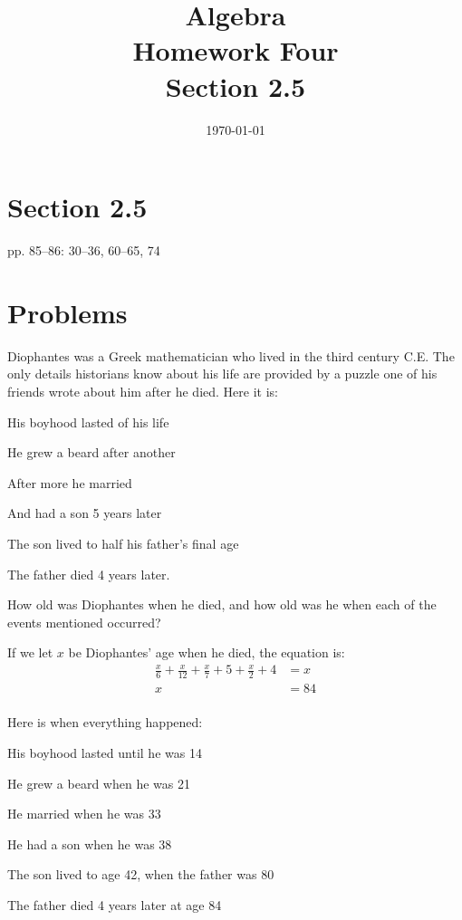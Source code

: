 \documentclass[letterpaper, landscape]{exam}
\title{Algebra \\ Homework Four \\ Section 2.5}
\author{}
\date{\today}
\begin{document}
  \maketitle

  \section{Section 2.5}
  pp. 85--86: 30--36, 60--65, 74

  \section{Problems}

  \begin{questions}

    \question{}
    Diophantes was a Greek mathematician who lived in the third century C.E.  The only details
    historians know about his life are provided by a puzzle one of his friends wrote about him after
    he died.  Here it is:

    \begin{itemize*}
      \item His boyhood lasted  of his life
      \item He grew a beard after another 
      \item After  more he married
      \item And had a son 5 years later
      \item The son lived to half his father's final age
      \item The father died 4 years later.
    \end{itemize*}

    How old was Diophantes when he died, and how old was he when each of the events mentioned occurred?

    \begin{solution}
      If we let $x$ be Diophantes' age when he died, the equation is:
      \begin{align*}
        \frac{x}{6} + \frac{x}{12} + \frac{x}{7} + 5 + \frac{x}{2} + 4 & = x \\
        x                                                              & = \boxed{84} \\
      \end{align*}

      Here is when everything happened:
      \begin{itemize*}
        \item His boyhood lasted until he was 14
        \item He grew a beard when he was 21 
        \item He married when he was 33
        \item He had a son when he was 38
        \item The son lived to age 42, when the father was 80
        \item The father died 4 years later at age 84
      \end{itemize*}


\end{solution}
\end{questions}
\end{document}
